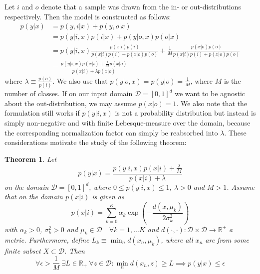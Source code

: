 \documentclass[12pt]{article}
\begin{document}
Let $i$ and $o$ denote that a sample was drawn from the in- or out-distributions respectively. Then the model is constructed as follows:
\begin{align}
p(y|x) &= p(y,i|x) + p(y,o|x) \\
&= p(y|i,x)p(i|x) + p(y|o,x)p(o|x) \\
&= p(y|i,x) \frac{p(x|i)p(i)}{p(x|i)p(i)+p(x|o)p(o)} + \frac{1}{M} \frac{p(x|o)p(o)}{p(x|i)p(i)+p(x|o)p(o)} \\
&= \frac{p(y|i,x)p(x|i) + \frac{\lambda}{M} p(x|o) }{p(x|i) + \lambda p(x|o)}
\end{align}
where $\lambda \equiv \frac{p(o)}{p(i)}$. We also use that $p(y|o,x)=p(y|o)=\frac{1}{M}$, where $M$ is the number of classes. If on our input domain $\mathcal{D}=[0,1]^d$ we want to be agnostic about the out-distribution, we may assume $p(x|o)=1$. We also note that the formulation still works if $p(y|i,x)$ is not a probability distribution but instead is simply non-negative and with finite Lebesque-measure over the domain, because the corresponding normalization factor can simply be reabsorbed into $\lambda$. These considerations motivate the study of the following theorem:

\newtheorem{theorem}{Theorem}
\begin{theorem}\label{Thr:thr1}
Let 
$$p(y|x)=\frac{p(y|i,x)p(x|i) + \frac{\lambda}{M} }{p(x|i) + \lambda}$$
on the domain $\mathcal{D}=[0,1]^d$, where $0\leq p(y|i,x) \leq 1$, $\lambda > 0$ and $M>1$. Assume that on the domain $p(x|i)$ is given as
$$ p(x|i) = \sum_{k=0}^K \alpha_k \exp \left(-\frac{d(x,\mu_k)}{2\sigma_k^2} \right)$$
with $\alpha_k>0$, $\sigma_k^2>0$ and $\mu_k \in \mathcal{D} \quad \forall k=1,\hdots K$ and $d(\cdot,\cdot):\mathcal{D} \times \mathcal{D} \rightarrow \mathbb{R}^+$ a metric. Furthermore, define $L_k \equiv \min_n d \left(x_n, \mu_k \right)$, where all $x_n$ are from some finite subset $X \subset \mathcal{D}$.
Then 
$$\forall \epsilon > \frac{1}{M} \ \exists L\in  \mathbb{R}_+ \ \forall z\in \mathcal{D}: \min_n d\left(x_n, z \right) \geq L \implies p(y|x)\leq \epsilon $$
\end{theorem}
\end{document}
